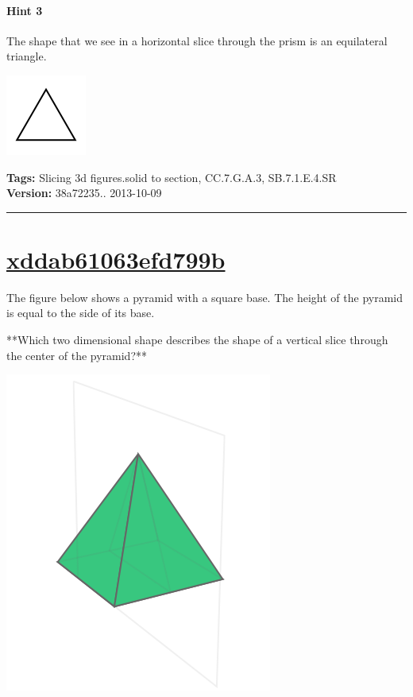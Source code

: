 \documentclass[twocolumn,10pt]{article}
\def\shrinkfactor{0.4}
\begin{document}
\paragraph{Hint 3}The shape that we see in a horizontal slice through the prism is an equilateral triangle.   

\includegraphics[scale=\shrinkfactor]{figures/15c855a8a232e6c1873c5f46769050a9c13051b8.png}



\medskip
\noindent
\textbf{Tags:} {\footnotesize Slicing 3d figures.solid to section, CC.7.G.A.3, SB.7.1.E.4.SR}\\
\textbf{Version:} 38a72235.. 2013-10-09
\smallskip\hrule





\section{\href{https://www.khanacademy.org/devadmin/content/items/xddab61063efd799b}{xddab61063efd799b}}

\noindent
The figure below shows a pyramid with a square base. The height of the pyramid is equal to the side of its base. 

**Which two dimensional shape describes the shape of a vertical slice through the center of the  pyramid?**  


\includegraphics[scale=\shrinkfactor]{figures/5886f271642379937f772874924e3bcee68b664a.png}
\end{document}
